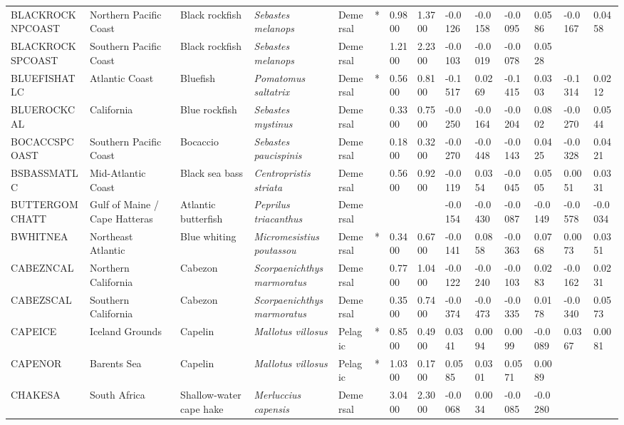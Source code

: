 \begin{longtable}{p{2.8cm}p{2cm}p{1.7cm}p{1.7cm}p{1cm}p{0.3cm}p{1cm}p{1cm}p{1cm}p{1cm}p{1cm}p{1cm}p{1cm}p{1cm}}
  BLACKROCKNPCOAST & Northern Pacific Coast & Black rockfish & \textit{Sebastes melanops} & Demersal & * & 0.9800 & 1.3700 & -0.0126 & -0.0158 & -0.0095 & 0.0586 & -0.0167 & 0.0458 \\ 
  BLACKROCKSPCOAST & Southern Pacific Coast & Black rockfish & \textit{Sebastes melanops} & Demersal &   & 1.2100 & 2.2300 & -0.0103 & -0.0019 & -0.0078 & 0.0528 &  &  \\ 
  BLUEFISHATLC & Atlantic Coast & Bluefish & \textit{Pomatomus saltatrix} & Demersal & * & 0.5600 & 0.8100 & -0.1517 & 0.0269 & -0.1415 & 0.0303 & -0.1314 & 0.0212 \\ 
  BLUEROCKCAL & California & Blue rockfish & \textit{Sebastes mystinus} & Demersal &   & 0.3300 & 0.7500 & -0.0250 & -0.0164 & -0.0204 & 0.0802 & -0.0270 & 0.0544 \\ 
  BOCACCSPCOAST & Southern Pacific Coast & Bocaccio & \textit{Sebastes paucispinis} & Demersal &   & 0.1800 & 0.3200 & -0.0270 & -0.0448 & -0.0143 & 0.0425 & -0.0328 & 0.0421 \\ 
  BSBASSMATLC & Mid-Atlantic Coast & Black sea bass & \textit{Centropristis striata} & Demersal &   & 0.5600 & 0.9200 & -0.0119 & 0.0354 & -0.0045 & 0.0505 & 0.0051 & 0.0331 \\ 
  BUTTERGOMCHATT & Gulf of Maine / Cape Hatteras & Atlantic butterfish & \textit{Peprilus triacanthus} & Demersal &  &  &  & -0.0154 & -0.0430 & -0.0087 & -0.0149 & -0.0578 & -0.0034 \\ 
  BWHITNEA & Northeast Atlantic & Blue whiting & \textit{Micromesistius poutassou} & Demersal & * & 0.3400 & 0.6700 & -0.0141 & 0.0858 & -0.0363 & 0.0768 & 0.0073 & 0.0351 \\ 
  CABEZNCAL & Northern California & Cabezon & \textit{Scorpaenichthys marmoratus} & Demersal &   & 0.7700 & 1.0400 & -0.0122 & -0.0240 & -0.0103 & 0.0283 & -0.0162 & 0.0231 \\ 
  CABEZSCAL & Southern California & Cabezon & \textit{Scorpaenichthys marmoratus} & Demersal &   & 0.3500 & 0.7400 & -0.0374 & -0.0473 & -0.0335 & 0.0178 & -0.0340 & 0.0573 \\ 
  CAPEICE & Iceland Grounds & Capelin & \textit{Mallotus villosus} & Pelagic & * & 0.8500 & 0.4900 & 0.0341 & 0.0094 & 0.0099 & -0.0089 & 0.0367 & 0.0081 \\ 
  CAPENOR & Barents Sea & Capelin & \textit{Mallotus villosus} & Pelagic & * & 1.0300 & 0.1700 & 0.0585 & 0.0301 & 0.0571 & 0.0089 &  &  \\ 
  CHAKESA & South Africa & Shallow-water cape hake & \textit{Merluccius capensis} & Demersal &   & 3.0400 & 2.3000 & -0.0068 & 0.0034 & -0.0085 & -0.0280 &  &  \\ 

\end{longtable}
